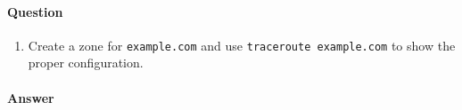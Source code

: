 \documentclass[a4paper,11pt,singlespacing]{article}
\providecommand{\tightlist}{%
  \setlength{\itemsep}{0pt}\setlength{\parskip}{0pt}}
\begin{document}
\paragraph{Question}\label{question-1}

\begin{enumerate}
\def\labelenumi{\arabic{enumi}.}
\tightlist
\item
  Create a zone for \texttt{example.com} and use
  \texttt{traceroute\ example.com} to show the proper configuration.
\end{enumerate}

\newpage

\paragraph{Answer}\label{answer}
\end{document}
